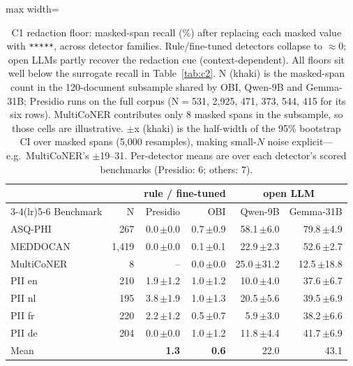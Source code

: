 \documentclass[11pt]{article}
\newcommand{\tp}[1]{\texttt{#1}}
\newcommand{\nk}[1]{{\footnotesize\textcolor{ckhaki}{#1}}}
\newcommand{\vc}[2]{#1\,{\scriptsize\textcolor{ckhaki}{$\pm$#2}}}
\begin{document}
\begin{table}[t]\centering\small
\begin{adjustbox}{max width=\columnwidth}%
\begin{tabular}{lrrrrr}
\toprule
 & & \multicolumn{2}{c}{rule / fine-tuned} & \multicolumn{2}{c}{open LLM}\\
\cmidrule(lr){3-4}\cmidrule(lr){5-6}
Benchmark & \nk{N} & Presidio & OBI & Qwen-9B & Gemma-31B\\
\midrule
ASQ-PHI & \nk{267} & \vc{0.0}{0.0} & \vc{0.7}{0.9} & \vc{58.1}{6.0} & \vc{79.8}{4.9}\\
MEDDOCAN & \nk{1{,}419} & \vc{0.0}{0.0} & \vc{0.1}{0.1} & \vc{22.9}{2.3} & \vc{52.6}{2.7}\\
MultiCoNER & \nk{8} & -- & \vc{0.0}{0.0} & \vc{25.0}{31.2} & \vc{12.5}{18.8}\\
PII en & \nk{210} & \vc{1.9}{1.2} & \vc{1.0}{1.2} & \vc{10.0}{4.0} & \vc{37.6}{6.7}\\
PII nl & \nk{195} & \vc{3.8}{1.9} & \vc{1.0}{1.3} & \vc{20.5}{5.6} & \vc{39.5}{6.9}\\
PII fr & \nk{220} & \vc{2.2}{1.2} & \vc{0.5}{0.7} & \vc{5.9}{3.0} & \vc{38.2}{6.6}\\
PII de & \nk{204} & \vc{0.0}{0.0} & \vc{1.0}{1.2} & \vc{11.8}{4.4} & \vc{41.7}{6.9}\\
\midrule
Mean & & \textbf{1.3} & \textbf{0.6} & 22.0 & 43.1\\
\bottomrule
\end{tabular}
\end{adjustbox}
\caption{C1 redaction floor: masked-span recall (\%) after replacing each masked value with \tp{*****}, across detector families. Rule/fine-tuned detectors collapse to $\approx$0; open LLMs partly recover the redaction cue (context-dependent). All floors sit well below the surrogate recall in Table~\ref{tab:c2}. \nk{N} (khaki) is the masked-span count in the 120-document subsample shared by OBI, Qwen-9B and Gemma-31B; Presidio runs on the full corpus (N${=}$531, 2{,}925, 471, 373, 544, 415 for its six rows). MultiCoNER contributes only 8 masked spans in the subsample, so those cells are illustrative. \nk{$\pm$x} (khaki) is the half-width of the 95\% bootstrap CI over masked spans (5{,}000 resamples), making small-$N$ noise explicit---e.g.\ MultiCoNER's $\pm$19--31. Per-detector means are over each detector's scored benchmarks (Presidio: 6; others: 7).}\label{tab:c1}
\end{table}
\end{document}
